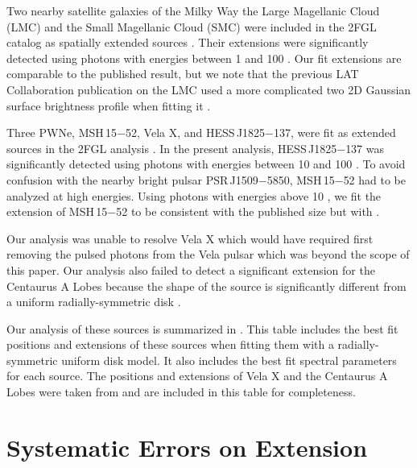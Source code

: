 Two nearby satellite galaxies of the Milky Way the Large
Magellanic Cloud (LMC) and the Small Magellanic Cloud (SMC)
were included in the 2FGL catalog as spatially extended sources
\citep{abdo_2010a_observations-large,abdo_2010a_detection-small}.
Their extensions were significantly detected using photons with energies
between 1 \gev and 100 \gev. Our fit extensions are comparable to
the published result, but we note that the previous LAT Collaboration
publication on the LMC used a more complicated two 2D Gaussian surface
brightness profile when fitting it \citep{abdo_2010a_observations-large}.

Three PWNe, MSH\,15$-$52, Vela X, and HESS\,J1825$-$137,
were fit as extended sources in the 2FGL analysis
\citep{abdo_2010a_detection-energetic,abdo_2010c_fermi-large,grondin_2011a_detection-pulsar}.
In the present analysis, HESS\,J1825$-$137 was significantly detected
using photons with energies between 10 \gev and 100 \gev.  To avoid
confusion with the nearby bright pulsar PSR\,J1509$-$5850, MSH\,15$-$52
had to be analyzed at high energies.  Using photons with energies above
10 \gev, we fit the extension of MSH\,15$-$52 to be consistent with the
published size but with .

Our analysis was unable to resolve Vela X which would have required first
removing the pulsed photons from the Vela pulsar which was beyond the
scope of this paper.  Our analysis also failed to detect a significant
extension for the Centaurus A Lobes because the shape of the source
is significantly different from a uniform radially-symmetric disk
\citep{abdo_2010a_fermi-gamma-ray}.



Our analysis of these sources is summarized in
.  This table includes the best
fit positions and extensions of these sources when fitting them
with a radially-symmetric uniform disk model. It also includes
the best fit spectral parameters for each source.  The positions
and extensions of Vela X and the Centaurus A Lobes were taken from
\cite{abdo_2010c_fermi-large,abdo_2010a_fermi-gamma-ray} and are included
in this table for completeness.

\section{Systematic Errors on Extension}

